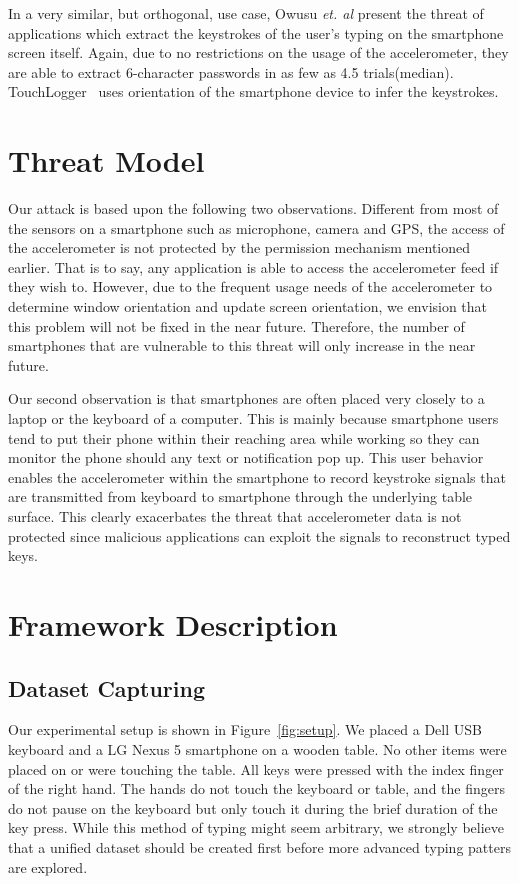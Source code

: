 \documentclass[11pt,conference]{IEEEtran}
\begin{document}
In a very similar, but orthogonal, use case, Owusu \emph{et. al}
\cite{owusu2012accessory}
present the threat of applications which extract the keystrokes of the
user's typing on the smartphone screen itself. Again, due to no restrictions
on the usage of the accelerometer, they are able to extract 6-character
passwords in as few as 4.5 trials(median). TouchLogger~\cite{cai2011touchlogger}
uses orientation of the smartphone device to infer the keystrokes.

\section{Threat Model}
\label{sec:threatmodel}
Our attack is based upon the following two observations. Different from most of the sensors on a smartphone such as microphone, camera and GPS, the access of the accelerometer is not protected by the permission mechanism mentioned earlier. That is to say, any application is able to access the accelerometer feed if they wish to. However, due to the frequent usage needs of the accelerometer to determine window orientation and update screen orientation, we envision that this problem will not be fixed in the near future. Therefore, the number of smartphones that are vulnerable to this threat will only increase in the near future.

Our second observation is that smartphones are often placed very closely to a laptop or the keyboard of a computer. This is mainly because smartphone users tend to put their phone within their reaching area while working so they can monitor the phone should any text or notification pop up. This user behavior enables the accelerometer within the smartphone to record keystroke signals that are transmitted from keyboard to smartphone through the underlying table surface. This clearly exacerbates the threat that accelerometer data is not protected since malicious applications can exploit the signals to reconstruct typed keys.


\section{Framework Description}

\subsection{Dataset Capturing}
\label{sec:dataset-capturing}
Our experimental setup is shown in Figure~\ref{fig:setup}. We placed a Dell USB keyboard and a LG Nexus 5 smartphone on a wooden table. No other items were placed on or were touching the table. All keys were pressed with the index finger of the right hand. The hands do not touch the keyboard or table, and the fingers do not pause on the keyboard but only touch it during the brief duration of the key press. While this method of typing might seem arbitrary, we strongly believe that a unified dataset should be created first before more advanced typing patters are explored.
\end{document}
